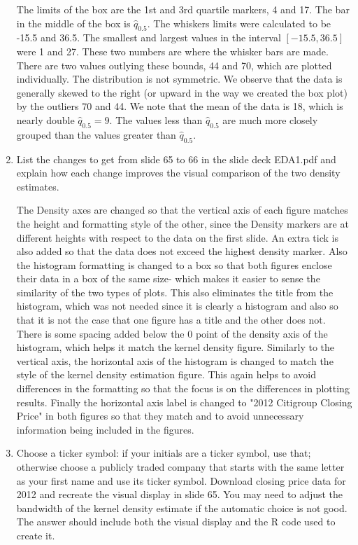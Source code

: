 \documentclass[letterpaper,12pt,fleqn]{article}
\begin{document}
\begin{enumerate}
The limits of the box are the 1st and 3rd quartile markers, 4 and 17. The bar in the middle of the box is $\hat{q}_{0.5}$. The whiskers limits were calculated to be -15.5 and 36.5. The smallest and largest values in the interval $[-15.5,36.5]$ were 1 and 27. These two numbers are where the whisker bars are made. There are two values outlying these bounds, 44 and 70, which are plotted individually. The distribution is not symmetric. We observe that the data is generally skewed to the right (or upward in the way we created the box plot) by the outliers 70 and 44. We note that the mean of the data is 18, which is nearly double $\hat{q}_{0.5} = 9$. The values less than $\hat{q}_{0.5}$ are much more closely grouped than the values greater than $\hat{q}_{0.5}$.

\vspace{1.5em}

\item List the changes to get from slide 65 to 66 in the slide deck EDA1.pdf and explain how each change improves the visual comparison of the two density estimates.

The Density axes are changed so that the vertical axis of each figure matches the height and formatting style of the other, since the Density markers are at different heights with respect to the data on the first slide. An extra tick is also added so that the data does not exceed the highest density marker. Also the histogram formatting is changed to a box so that both figures enclose their data in a box of the same size- which makes it easier to sense the similarity of the two types of plots. This also eliminates the title from the histogram, which was not needed since it is clearly a histogram and also so that it is not the case that one figure has a title and the other does not. There is some spacing added below the 0 point of the density axis of the histogram, which helps it match the kernel density figure. Similarly to the vertical axis, the horizontal axis of the histogram is changed to match the style of the kernel density estimation figure. This again helps to avoid differences in the formatting so that the focus is on the differences in plotting results. Finally the horizontal axis label is changed to "2012 Citigroup Closing Price" in both figures so that they match and to avoid unnecessary information being included in the figures. 
\vspace{1.5em}

\item Choose a ticker symbol: if your initials are a ticker symbol, use that; otherwise choose a publicly traded company that starts with the same letter as your first name and use its ticker symbol.  Download closing price data for 2012 and recreate the visual display in slide 65.  You may need to adjust the bandwidth of the kernel density estimate if the automatic choice is not good.  The answer should include both the visual display and the R code used to create it. \\


\end{enumerate}
\end{document}
